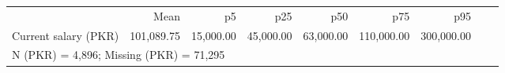 \begin{tabular}{lrrrrrrrr}


\toprule


                    &        Mean&          p5&         p25&         p50&         p75&         p95\\

Current salary (PKR)&  101,089.75&   15,000.00&   45,000.00&   63,000.00&  110,000.00&  300,000.00\\
\bottomrule


\multicolumn{8}{l}{\footnotesize N (PKR) =        4,896; Missing (PKR) =       71,295}\\


\end{tabular}


